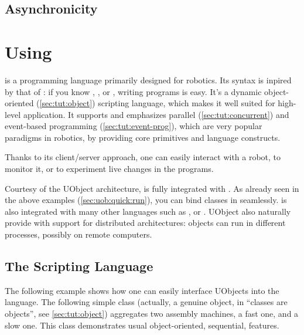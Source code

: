 \subsection{Asynchronicity}


\section{Using \us}


\us is a programming language primarily designed for robotics.  Its
syntax is inpired by that of \Cxx: if you know \C, \Cxx, \java or \Cs,
writing \us programs is easy.  It's a dynamic object-oriented
(\autoref{sec:tut:object}) scripting language, which makes it well
suited for high-level application.  It supports and emphasizes
parallel (\autoref{sec:tut:concurrent}) and event-based programming
(\autoref{sec:tut:event-prog}), which are very popular paradigms in
robotics, by providing core primitives and language constructs.

Thanks to its client/server approach, one can easily interact with a
robot, to monitor it, or to experiment live changes in the \us
programs.

Courtesy of the UObject architecture, \us is fully integrated with
\Cxx. As already seen in the above examples
(\autoref{sec:uob:quick:run}), you can bind \Cxx classes in \us
seamlessly. \us is also integrated with many other languages such as
\java, \matlab or \python.  UObject also naturally provide \us with
support for distributed architectures: objects can run in different
processes, possibly on remote computers.

\subsection{The \us Scripting Language}

The following example shows how one can easily interface UObjects into
the \us language.  The following simple class (actually, a genuine
object, in \us ``classes are objects'', see \autoref{sec:tut:object})
aggregates two assembly machines, a fast one, and a slow one.  This
class demonstrates usual object-oriented, sequential, features.

